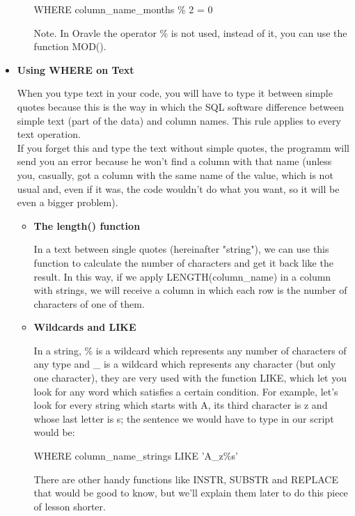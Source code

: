\documentclass[10pt, oneside]{article}
\begin{document}
\begin{itemize}
\begin{itemize}
		\begin{center}
			WHERE column\_name\_months \% 2 = 0
		\end{center}
		
		\color{blue}Note. \color{black}In Oravle the operator \% is not used, instead of it, you can use the function MOD().
	\end{itemize}
	
	\item \textbf{Using WHERE on Text}
	
	When you type text in your code, you will have to type it between simple quotes because this is the way in which the SQL software difference between simple text (part of the data) and column names. This rule applies to every text operation. \\
	
	If you forget this and type the text without simple quotes, the programm will send you an error because he won't find a column with that name (unless you, casually, got a column with the same name of the value, which is not usual and, even if it was, the code wouldn't do what you want, so it will be even a bigger problem).
	
	\begin{itemize}
		\item \textbf{The length() function}
		
		In a text between single quotes (hereinafter "string"), we can use this function to calculate the number of characters and get it back like the result. In this way, if we apply LENGTH(column\_name) in a column with strings, we will receive a column in which each row is the number of characters of one of them.
		
		\item \textbf{Wildcards and LIKE}
		
		In a string, \% is a wildcard which represents any number of characters of any type and \_ is a wildcard which represents any character (but only one character), they are very used with the function LIKE, which let you look for any word which satisfies a certain condition. For example, let's look for every string which starts with A, its third character is z and whose last letter is s; the sentence we would have to type in our script would be:
		
		\begin{center}
			WHERE column\_name\_strings LIKE 'A\_z\%s'
		\end{center}
				
		There are other handy functions like INSTR, SUBSTR and REPLACE that would be good to know, but we'll explain them later to do this piece of lesson shorter.\\
		

\end{itemize}
\end{itemize}
\end{document}
